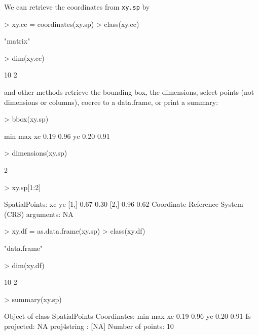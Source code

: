 \documentclass{article}
\begin{document}
We can retrieve the coordinates from {\tt xy.sp} by
\begin{Schunk}
\begin{Sinput}
> xy.cc = coordinates(xy.sp)
> class(xy.cc)
\end{Sinput}
\begin{Soutput}
[1] "matrix"
\end{Soutput}
\begin{Sinput}
> dim(xy.cc)
\end{Sinput}
\begin{Soutput}
[1] 10  2
\end{Soutput}
\end{Schunk}
and other methods retrieve the bounding box, the dimensions, select points
(not dimensions or columns), coerce to a data.frame, or print a summary:
\begin{Schunk}
\begin{Sinput}
> bbox(xy.sp)
\end{Sinput}
\begin{Soutput}
    min  max
xc 0.19 0.96
yc 0.20 0.91
\end{Soutput}
\begin{Sinput}
> dimensions(xy.sp)
\end{Sinput}
\begin{Soutput}
[1] 2
\end{Soutput}
\begin{Sinput}
> xy.sp[1:2]
\end{Sinput}
\begin{Soutput}
SpatialPoints:
       xc   yc
[1,] 0.67 0.30
[2,] 0.96 0.62
Coordinate Reference System (CRS) arguments: NA 
\end{Soutput}
\begin{Sinput}
> xy.df = as.data.frame(xy.sp)
> class(xy.df)
\end{Sinput}
\begin{Soutput}
[1] "data.frame"
\end{Soutput}
\begin{Sinput}
> dim(xy.df)
\end{Sinput}
\begin{Soutput}
[1] 10  2
\end{Soutput}
\begin{Sinput}
> summary(xy.sp)
\end{Sinput}
\begin{Soutput}
Object of class SpatialPoints
Coordinates:
    min  max
xc 0.19 0.96
yc 0.20 0.91
Is projected: NA 
proj4string : [NA]
Number of points: 10
\end{Soutput}
\end{Schunk}
\end{document}
